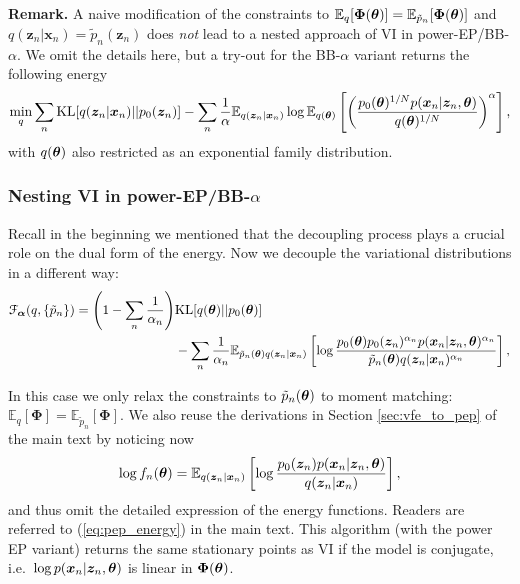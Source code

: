 \vspace{1em}
\begin{tcolorbox}
\textbf{Remark.} A naive modification of the constraints to $\mathbb{E}_{q}[\bm{\Phi}(\bm{\theta})] = \mathbb{E}_{\tilde{p}_n}[\bm{\Phi}(\bm{\theta})]$ and $q(\bm{z}_n|\bm{x}_n) = \tilde{p}_n(\bm{z}_n)$ does \emph{not} lead to a nested approach of VI in power-EP/BB-$\alpha$. We omit the details here, but a try-out for the BB-$\alpha$ variant returns the following energy
\begin{equation}
 \min_{q} \sum_n \mathrm{KL}[q(\bm{z}_n|\bm{x}_n) || p_0(\bm{z}_n)] - \sum_n \frac{1}{\alpha} \mathbb{E}_{q(\bm{z}_n|\bm{x}_n)} \log \mathbb{E}_{q(\bm{\theta})} \left[ \left( \frac{p_0(\bm{\theta})^{1/N} p(\bm{x}_n|\bm{z}_n, \bm{\theta})}{q(\bm{\theta})^{1/N}} \right)^{\alpha} \right],
\end{equation}
with $q(\bm{\theta})$ also restricted as an exponential family distribution. 
\end{tcolorbox}

\subsubsection{Nesting VI in power-EP/BB-$\alpha$}
\label{sec:pep_vi}
Recall in the beginning we mentioned that the decoupling process plays a crucial role on the dual form of the energy. Now we decouple the variational distributions in a different way:
\begin{equation}
\begin{aligned}
\mathcal{F}_{\bm{\alpha}}(q, \{ \tilde{p}_n \} ) = \left(1 - \sum_n \frac{1}{\alpha_n} \right) & \mathrm{KL}[q(\bm{\theta})||p_0(\bm{\theta})] 
\\ & - \sum_n \frac{1}{\alpha_n} \mathbb{E}_{\tilde{p}_n(\bm{\theta}) q(\bm{z}_n|\bm{x}_n)} \left[ \log \frac{p_0(\bm{\theta}) p_0(\bm{z}_n)^{\alpha_n} p( \bm{x}_n | \bm{z}_n, \bm{\theta})^{\alpha_n}}{ \tilde{p}_n(\bm{\theta})q(\bm{z}_n|\bm{x}_n)^{\alpha_n} } \right],
\end{aligned}
\end{equation}

In this case we only relax the constraints to $\tilde{p}_n(\bm{\theta})$ to moment matching: $\mathbb{E}_{q}[\bm{\Phi}] = \mathbb{E}_{\tilde{p}_n}[\bm{\Phi}]$.
%
We also reuse the derivations in Section \ref{sec:vfe_to_pep} of the main text by noticing now 
\begin{equation}
\log f_n(\bm{\theta}) = \mathbb{E}_{q(\bm{z}_n|\bm{x}_n)} \left[ \log \frac{p_0(\bm{z}_n) p(\bm{x}_n|\bm{z}_n, \bm{\theta}) }{q(\bm{z}_n|\bm{x}_n)} \right],
\end{equation}
and thus omit the detailed expression of the energy functions. Readers are referred to (\ref{eq:pep_energy}) in the main text.
%
This algorithm (with the power EP variant) returns the same stationary points as VI if the model is conjugate, i.e.~$\log p(\bm{x}_n |\bm{z}_n, \bm{\theta})$ is linear in $\bm{\Phi}(\bm{\theta})$. 

